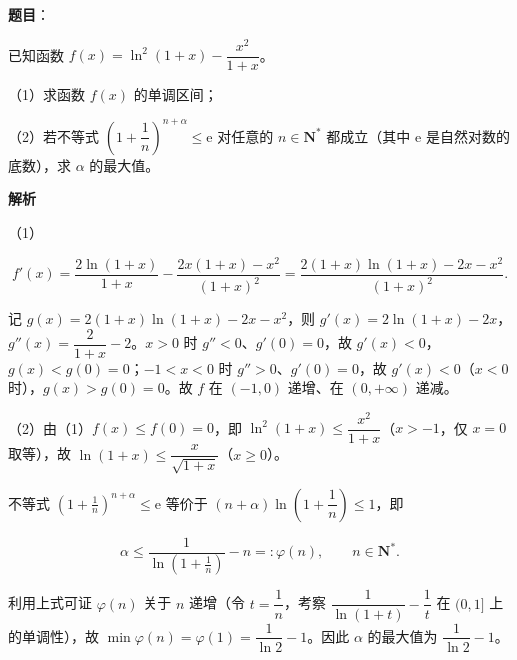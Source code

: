 \begin{answer}

\textbf{题目}：

已知函数 $f(x)=\ln^2(1+x)-\dfrac{x^2}{1+x}$。

（1）求函数 $f(x)$ 的单调区间；

（2）若不等式 $\left(1+\dfrac1n\right)^{n+\alpha}\leqslant\mathrm e$ 对任意的 $n\in\mathbf N^*$ 都成立（其中 $\mathrm e$ 是自然对数的底数），求 $\alpha$ 的最大值。

\textbf{解析}

（1）

\nopagebreak[4]
\[f'(x)=\frac{2\ln(1+x)}{1+x}-\frac{2x(1+x)-x^2}{(1+x)^2}=\frac{2(1+x)\ln(1+x)-2x-x^2}{(1+x)^2}.\]

记 $g(x)=2(1+x)\ln(1+x)-2x-x^2$，则 $g'(x)=2\ln(1+x)-2x$，$g''(x)=\dfrac2{1+x}-2$。$x>0$ 时 $g''<0$、$g'(0)=0$，故 $g'(x)<0$，$g(x)<g(0)=0$；$-1<x<0$ 时 $g''>0$、$g'(0)=0$，故 $g'(x)<0$（$x<0$ 时），$g(x)>g(0)=0$。故 $f$ 在 $(-1,0)$ 递增、在 $(0,+\infty)$ 递减。

（2）由（1）$f(x)\leqslant f(0)=0$，即 $\ln^2(1+x)\leqslant\dfrac{x^2}{1+x}$（$x>-1$，仅 $x=0$ 取等），故 $\ln(1+x)\leqslant\dfrac x{\sqrt{1+x}}$（$x\geqslant0$）。

不等式 $(1+\frac1n)^{n+\alpha}\leqslant\mathrm e$ 等价于 $(n+\alpha)\ln\left(1+\dfrac1n\right)\leqslant1$，即

\nopagebreak[4]
\[\alpha\leqslant\frac1{\ln\left(1+\frac1n\right)}-n=:\varphi(n),\qquad n\in\mathbf N^*.\]

利用上式可证 $\varphi(n)$ 关于 $n$ 递增（令 $t=\dfrac1n$，考察 $\dfrac1{\ln(1+t)}-\dfrac1t$ 在 $(0,1]$ 上的单调性），故 $\min\varphi(n)=\varphi(1)=\dfrac1{\ln2}-1$。因此 $\alpha$ 的最大值为 $\dfrac1{\ln2}-1$。


\end{answer}